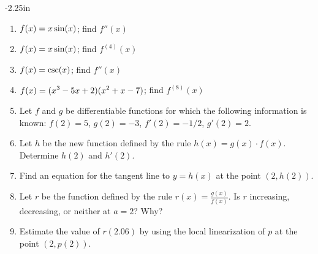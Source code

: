 \begin{adjustwidth*}{}{-2.25in}
\begin{multicols*}{2}

\begin{enumerate}[1),resume]
\item $\displaystyle f(x) = x \sin(x)$; find $f''(x)$
\item $\displaystyle f(x) = x \sin(x)$; find $f^{(4)}(x)$
\item $\displaystyle f(x) = \csc(x)$; find $f''(x)$
\item $\displaystyle f(x) = (x^3 - 5x + 2)(x^2 + x - 7)$; find $f^{(8)}(x)$

\item Let $f$ and $g$ be differentiable functions for which the following information is known:  $f(2) = 5$, $g(2) = -3$, $f'(2) = -1/2$, $g'(2) = 2$.
\ba
	\item Let $h$ be the new function defined by the rule $h(x) = g(x) \cdot f(x)$.  Determine $h(2)$ and $h'(2)$.
	\item Find an equation for the tangent line to $y = h(x)$ at the point $(2,h(2))$.
	\item Let $r$ be the function defined by the rule $r(x) = \frac{g(x)}{f(x)}$.  Is $r$ increasing, decreasing, or neither at $a = 2$?  Why?
	\item Estimate the value of $r(2.06)$ by using the local linearization of $p$ at the point $(2,p(2))$.
\ea
\end{enumerate}

\end{multicols*}
\end{adjustwidth*}

\clearpage

